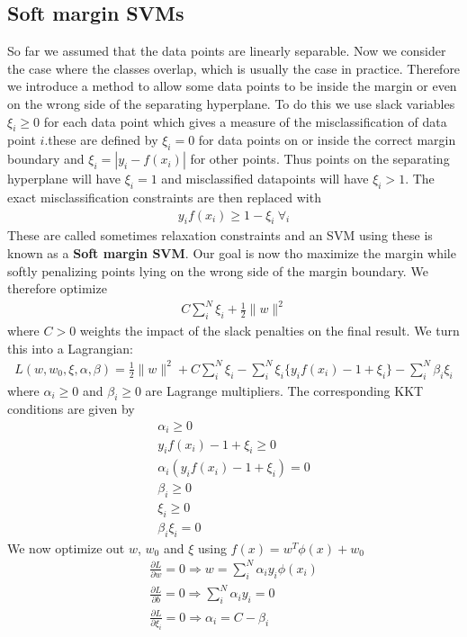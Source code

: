 \documentclass[main]{subfiles}
\begin{document}
\subsection{Soft margin SVMs}
So far we assumed that the data points are linearly separable. Now we consider the case where the classes overlap, which is usually the case in practice. Therefore we introduce a method to allow some data points to be inside the margin or even on the wrong side of the separating hyperplane. To do this we use slack variables $\xi_i \geq 0$ for each data point which gives a measure of the misclassification of data point $i$.these are defined by $\xi_i = 0$ for data points on or inside the correct margin boundary and $\xi_i=|y_i - f(x_i)|$ for other points. Thus points on the separating hyperplane will have $\xi_i=1$ and misclassified datapoints will have $\xi_i > 1$. The exact misclassification constraints are then replaced with 
\begin{align}
y_i f(x_i) \geq 1 - \xi_i \ \forall_i
\end{align}
These are called sometimes relaxation constraints and an SVM using these is known as a \textbf{Soft margin SVM}. Our goal is now tho maximize the margin while softly penalizing points lying on the wrong side of the margin boundary. We therefore optimize
\begin{align}
C \sum_i^N \xi_i + \frac{1}{2} \parallel w \parallel^2
\end{align}
where $C>0$ weights the impact of the slack penalties on the final result.
We turn this into a Lagrangian:
\begin{align}
L(w,w_0,\xi,\alpha,\beta)=\frac{1}{2}\parallel w \parallel^2+C \sum_i^N \xi_i-\sum_i^N \xi_i \{y_i f(x_i)-1 + \xi_i\}-\sum_i^N \beta_i \xi_i
\end{align}
where $\alpha_i \geq 0$ and $\beta_i \geq 0$ are Lagrange multipliers. The corresponding KKT conditions are given by
\begin{align}
\alpha_i \geq 0 \\
y_i f(x_i)-1+\xi_i \geq 0 \\
\alpha_i(y_i f(x_i)-1+\xi_i) = 0 \\
\beta_i \geq 0 \\
\xi_i \geq 0 \\
\beta_i \xi_i = 0
\end{align}
We now optimize out $w$, $w_0$ and $\xi$ using $f(x)=w^T\phi(x)+w_0$
\begin{align}
\frac{\partial L}{\partial w}=0 \Rightarrow w=\sum_i^N\alpha_i y_i\phi(x_i) \\
\frac{\partial L}{\partial b}=0 \Rightarrow \sum_i^N\alpha_i y_i = 0 \\
\frac{\partial L}{\partial \xi_i}=0 \Rightarrow \alpha_i=C-\beta_i
\end{align}
\end{document}
